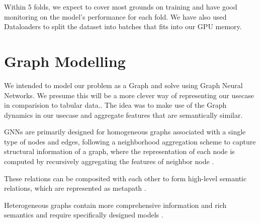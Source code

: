 \documentclass{report} %
\begin{document}
Within 5 folds, we expect to cover most grounds on training and have good monitoring on the model's performance for each fold.
We have also used Dataloaders to split the dataset into batches that fits into our GPU memory.


\chapter{Graph Modelling} 

We intended to model our problem as a Graph and solve using Graph Neural Networks. 
We presume this will be a more clever way of representing our usecase in comparision to tabular data..
The idea was to make use of the Graph dynamics in our usecase and aggregate features that are semantically similar.

GNNs are primarily designed for homogeneous graphs associated with a single type of nodes
and edges, following a neighborhood aggregation scheme to capture structural information of a graph, where the representation 
of each node is computed by recursively aggregating the features of neighbor node \cite{02}.

These relations can be composited with each other to form high-level semantic relations, which are represented as metapath \cite{02}.

Heterogeneous graphs contain more comprehensive information and rich semantics and require specifically designed models  \cite{02}.


\end{document}
